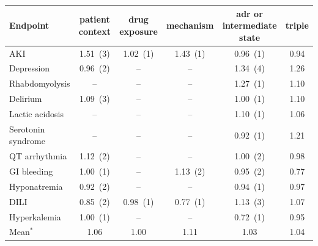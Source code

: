 \begin{tabular}{lSSSSS}
  \toprule
  Endpoint & {patient context} & {drug exposure} & {mechanism} & {adr or intermediate state} & {triple} \\
  \midrule
  AKI & 1.51~(3) & 1.02~(1) & 1.43~(1) & 0.96~(1) & 0.94 \\
  Depression & 0.96~(2) & {--} & {--} & 1.34~(4) & 1.26 \\
  Rhabdomyolysis & {--} & {--} & {--} & 1.27~(1) & 1.10 \\
  Delirium & 1.09~(3) & {--} & {--} & 1.00~(1) & 1.10 \\
  Lactic acidosis & {--} & {--} & {--} & 1.10~(1) & 1.06 \\
  Serotonin syndrome & {--} & {--} & {--} & 0.92~(1) & 1.21 \\
  QT arrhythmia & 1.12~(2) & {--} & {--} & 1.00~(2) & 0.98 \\
  GI bleeding & 1.00~(1) & {--} & 1.13~(2) & 0.95~(2) & 0.77 \\
  Hyponatremia & 0.92~(2) & {--} & {--} & 0.94~(1) & 0.97 \\
  DILI & 0.85~(2) & 0.98~(1) & 0.77~(1) & 1.13~(3) & 1.07 \\
  Hyperkalemia & 1.00~(1) & {--} & {--} & 0.72~(1) & 0.95 \\
  \midrule
  Mean$^{*}$ & 1.06 & 1.00 & 1.11 & 1.03 & 1.04 \\
  \bottomrule
\end{tabular}